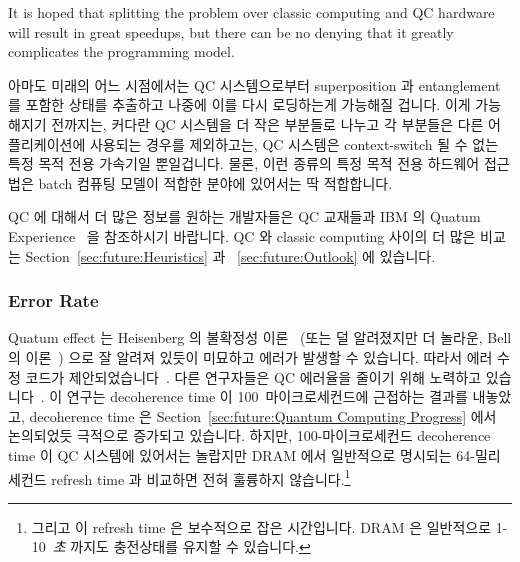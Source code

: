 It is hoped that splitting the problem over classic computing and
QC hardware will result in great speedups, but there can be no denying
that it greatly complicates the programming model.
\fi

아마도 미래의 어느 시점에서는 QC 시스템으로부터 superposition 과 entanglement
를 포함한 상태를 추출하고 나중에 이를 다시 로딩하는게 가능해질 겁니다.
이게 가능해지기 전까지는, 커다란 QC 시스템을 더 작은 부분들로 나누고 각
부분들은 다른 어플리케이션에 사용되는 경우를 제외하고는, QC 시스템은
context-switch 될 수 없는 특정 목적 전용 가속기일 뿐일겁니다.
물론, 이런 종류의 특정 목적 전용 하드웨어 접근법은 batch 컴퓨팅 모델이 적합한
분야에 있어서는 딱 적합합니다.

QC 에 대해서 더 많은 정보를 원하는 개발자들은 QC 교재들과 IBM 의 Quatum
Experience~\cite{IBM2016QuantumExperience} 을 참조하시기 바랍니다.
QC 와 classic computing 사이의 더 많은 비교는
Section~\ref{sec:future:Heuristics} 과 ~\ref{sec:future:Outlook} 에 있습니다.

\subsubsection{Error Rate}
\label{sec:future:Error Rate}

Quatum effect 는 Heisenberg 의 불확정성
이론~\cite{WeinerHeisenberg1927Uncertain} (또는 덜 알려졌지만 더 놀라운, Bell
의 이론~\cite{JohnSBell1964EPRparadox}) 으로 잘 알려져 있듯이 미묘하고 에러가
발생할 수 있습니다.
따라서 에러 수정 코드가
제안되었습니다~\cite{ADCorcoles2015QuantumErrorDetection}.
다른 연구자들은 QC 에러율을 줄이기 위해 노력하고
있습니다~\cite{PhysRevB.77.180502,PhysRevLett.107.240501,PhysRevLett.111.080502,PhysRevB.86.100506,KristanTemme2016QC-error-mitigation}.
이 연구는 decoherence time 이 100~마이크로세컨드에 근접하는 결과를 내놓았고,
decoherence time 은 Section~\ref{sec:future:Quantum Computing Progress} 에서
논의되었듯 극적으로 증가되고 있습니다.
하지만, 100-마이크로세컨드 decoherence time 이 QC 시스템에 있어서는 놀랍지만
DRAM 에서 일반적으로 명시되는 64-밀리세컨드 refresh time 과 비교하면 전혀
훌륭하지 않습니다.\footnote{
	그리고 이 refresh time 은 보수적으로 잡은 시간입니다. DRAM 은
	일반적으로 1-10~\emph{초} 까지도 충전상태를 유지할 수 있습니다.}
\iffalse

